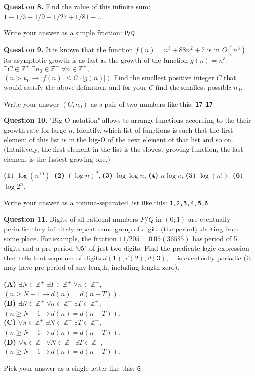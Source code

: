 \documentclass[jou]{apa6}
\begin{document}
\vspace{6pt}
{\bf Question 8.} Find the value of this infinite sum:
$1 - 1/3 + 1/9 - 1/27 + 1/81 - \ldots$. 

Write your answer as a simple fraction: {\tt P/Q}


\vspace{6pt}
{\bf Question 9.} It is known that the function $f(n) = n^3 +88n^2 +3$ is in $O(n^3)$ \textendash{}
its asymptotic growth is as fast as the growth of the function $g(n) = n^3$. 
$\exists C \in \mathbb{Z}^{+}\;\exists n_0 \in \mathbb{Z}^{+}\;\forall n \in \mathbb{Z}^{+},$\\
$(n > n_0 \rightarrow |f(n)| \leq C\cdot{}|g(n)|)$
Find the smallest positive integer $C$ that would satisfy the above definition, 
and for your $C$ find the smallest possible $n_0$.

Write your answer $(C,n_0)$ as a pair of two numbers like this: {\tt 17,17}


\vspace{6pt}
{\bf Question 10.}
"Big O notation" allows to arrange functions according to the their
growth rate for large $n$. 
Identify, which list of functions is such that 
the first element of this list is in the big-O of the 
next element of that list and so on. (Intuitively, the first element
in the list is the slowest growing function, the last element is the
fastest growing one.)

{\bf (1)} $\log (n^{10})$, {\bf (2)} $(\log n)^2$, {\bf (3)} $\log \log n$,
{\bf (4)} $n\log n$, {\bf (5)} $\log(n!)$, {\bf (6)} $\log 2^n$.

Write your answer as a comma-separated list like this: {\tt 1,2,3,4,5,6}


\vspace{6pt}
{\bf Question 11.} Digits of all rational numbers $P/Q$ in $(0;1)$
are eventually periodic: they infinitely repeat some group of digits (the period)
starting from some place. For example,
the fraction $11/205 = 0.05(36585)$ has period of 5 digits and a pre-period "05"
of just two digits.
Find the predicate logic expression that tells
that sequence of digits $d(1),d(2),d(3),\ldots$ is eventually periodic (it may have
pre-period of any length, including length zero).

\noindent
{\bf (A)} $\exists N \in \mathbb{Z}^{+}\;\exists T \in \mathbb{Z}^{+}\;\forall n \in \mathbb{Z}^{+},$\\
$\left(n \geq N - 1 \rightarrow d(n) = d(n+T)\right)$.\\
{\bf (B)} $\exists N \in \mathbb{Z}^{+}\;\forall n \in \mathbb{Z}^{+}\;\exists T \in \mathbb{Z}^{+},$\\
$\left(n \geq N - 1 \rightarrow d(n) = d(n+T)\right)$.\\
{\bf (C)} $\forall n \in \mathbb{Z}^{+}\;\exists N \in \mathbb{Z}^{+}\;\exists T \in \mathbb{Z}^{+},$\\
$\left(n \geq N - 1 \rightarrow d(n) = d(n+T)\right)$.\\
{\bf (D)} $\forall n \in \mathbb{Z}^{+}\;\forall N \in \mathbb{Z}^{+}\;\exists T \in \mathbb{Z}^{+},$\\
$\left(n \geq N - 1 \rightarrow d(n) = d(n+T)\right)$. 

Pick your answer as a single letter like this: {\tt G}
\end{document}
